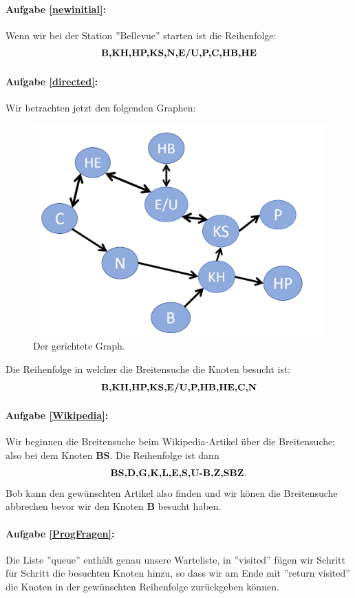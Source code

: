 \paragraph{ Aufgabe \ref{newinitial}:} Wenn wir bei der Station ''Bellevue'' starten ist die Reihenfolge: $$ \text{\bf{B,KH,HP,KS,N,E/U,P,C,HB,HE}}$$

\paragraph{Aufgabe \ref{directed}:} Wir betrachten jetzt den folgenden Graphen:\\
\begin{figure}[H]
    \centering
    \includegraphics[scale=0.3]{Pictures/directedTram.PNG} 
    \caption{Der gerichtete Graph.}
    \label{fig:my_label}
\end{figure}
Die Reihenfolge in welcher die Breitensuche die Knoten besucht ist:
$$ \text{\bf{B,KH,HP,KS,E/U,P,HB,HE,C,N}}$$

\paragraph{Aufgabe \ref{Wikipedia}:} Wir beginnen die Breitensuche beim Wikipedia-Artikel über die Breitensuche; also bei dem Knoten {\bf{BS}}. Die Reihenfolge ist dann
$$ \text{\bf{BS,D,G,K,L,E,S,U-B,Z,SBZ}}.$$
Bob kann den gewünschten Artikel also finden und wir könen die Breitensuche abbrechen bevor wir den Knoten {\bf{B}} besucht haben.

\paragraph{Aufgabe \ref{ProgFragen}:} Die Liste ''queue'' enthält genau unsere Warteliste, in ''visited'' fügen wir Schritt für Schritt die besuchten Knoten hinzu, so dass wir am Ende mit ''return visited'' die Knoten in der gewünschten Reihenfolge zurückgeben können.

